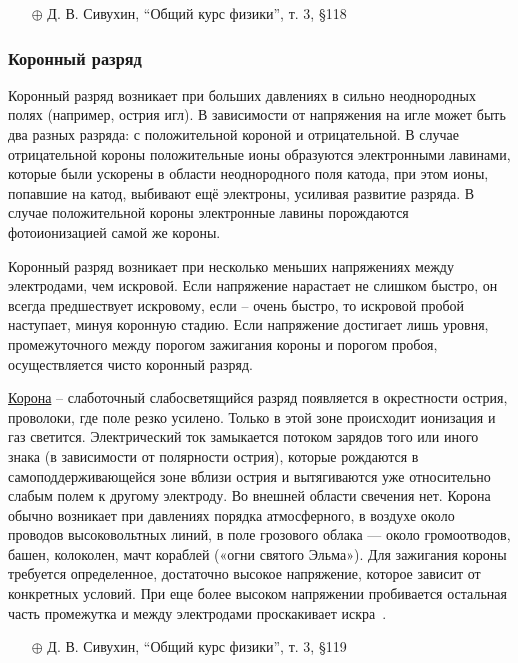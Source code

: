 \documentclass[10pt, a4paper]{article}
\begin{document}
\begin{itemize}
	\item[$\oplus$] Д. В. Сивухин, ``Общий курс физики'', т. 3, \S 118
\end{itemize}

\subsubsection{Коронный разряд}

Коронный разряд возникает при больших давлениях в сильно неоднородных полях (например, острия игл). В зависимости от напряжения на игле может быть два разных разряда: с положительной короной и отрицательной. В случае отрицательной короны положительные ионы образуются электронными лавинами, которые были ускорены в области неоднородного поля катода, при этом ионы, попавшие на катод, выбивают ещё электроны, усиливая развитие разряда. В случае положительной короны электронные лавины порождаются фотоионизацией самой же короны.

Коронный разряд возникает при несколько меньших напряжениях между электродами, чем искровой. Если напряжение нарастает не слишком быстро, он всегда предшествует искровому, если -- очень быстро, то искровой пробой наступает, минуя коронную стадию. Если напряжение достигает лишь уровня, промежуточного между порогом зажигания короны и порогом пробоя, осуществляется чисто коронный разряд.

\uline{Корона} -- слаботочный слабосветящийся разряд появляется в окрестности острия, проволоки, где поле резко усилено. Только в этой зоне происходит ионизация и газ светится. Электрический ток замыкается потоком зарядов того или иного знака (в зависимости от полярности острия), которые рождаются в самоподдерживающейся зоне вблизи острия и вытягиваются уже относительно слабым полем к другому электроду. Во внешней области свечения нет. Корона обычно возникает при давлениях порядка атмосферного, в воздухе около проводов высоковольтных линий, в поле грозового облака — около громоотводов, башен, колоколен, мачт кораблей («огни святого Эльма»). Для зажигания короны требуется определенное, достаточно высокое напряжение, которое зависит от конкретных условий. При еще более высоком напряжении пробивается остальная часть промежутка и между электродами проскакивает искра~\cite{raizer}.

\begin{itemize}
	\item[$\oplus$] Д. В. Сивухин, ``Общий курс физики'', т. 3, \S 119
\end{itemize}
\end{document}

